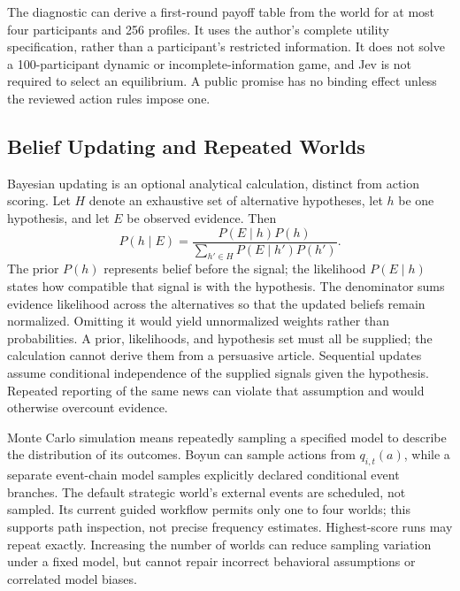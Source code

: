 The diagnostic can derive a first-round payoff table from the world for at
most four participants and 256 profiles. It uses the author's complete utility
specification, rather than a participant's restricted information. It does
not solve a 100-participant dynamic or incomplete-information game, and Jev
is not required to select an equilibrium. A public promise has no binding
effect unless the reviewed action rules impose one.

\subsection{Belief Updating and Repeated Worlds}\label{sec:probability}
Bayesian updating is an optional analytical calculation, distinct from action
scoring. Let $H$ denote an exhaustive set of alternative hypotheses, let $h$
be one hypothesis, and let $E$ be observed evidence. Then
\begin{equation}
P(h\mid E)=\frac{P(E\mid h)P(h)}{\sum_{h'\in H}P(E\mid h')P(h')}.
\label{eq:bayes}
\end{equation}
The prior $P(h)$ represents belief before the signal; the likelihood
$P(E\mid h)$ states how compatible that signal is with the hypothesis.
The denominator sums evidence likelihood across the alternatives so that the
updated beliefs remain normalized. Omitting it would yield unnormalized
weights rather than probabilities. A prior, likelihoods, and hypothesis set
must all be supplied; the calculation cannot derive them from a persuasive
article. Sequential updates assume conditional independence of the supplied
signals given the hypothesis. Repeated reporting of the same news can violate
that assumption and would otherwise overcount evidence.

Monte Carlo simulation means repeatedly sampling a specified model to
describe the distribution of its outcomes. Boyun can sample actions from
$q_{i,t}(a)$, while a separate event-chain model samples explicitly declared
conditional event branches. The default strategic world's external events
are scheduled, not sampled. Its current guided workflow permits only one to
four worlds; this supports path inspection, not precise frequency estimates.
Highest-score runs may repeat exactly. Increasing the number of worlds can
reduce sampling variation under a fixed model, but cannot repair incorrect
behavioral assumptions or correlated model biases.
